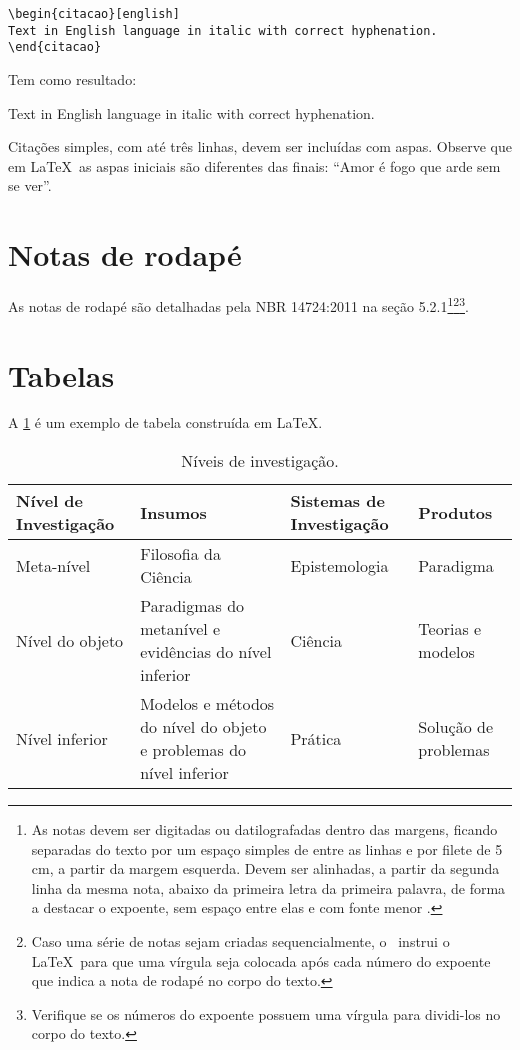 \begin{verbatim}
\begin{citacao}[english]
Text in English language in italic with correct hyphenation.
\end{citacao}
\end{verbatim}

Tem como resultado:

\begin{citacao}[english]
Text in English language in italic with correct hyphenation.
\end{citacao}

Citações simples, com até três linhas, devem ser incluídas com aspas. Observe que em \LaTeX\ as aspas iniciais são diferentes das finais: ``Amor é fogo que arde sem se ver''.

\section{Notas de rodapé}

As notas de rodapé são detalhadas pela NBR 14724:2011 na seção 5.2.1\footnote{As notas devem ser digitadas ou datilografadas dentro das margens, ficando separadas do texto por um espaço simples de entre as linhas e por filete de 5 cm, a partir da margem esquerda. Devem ser alinhadas, a partir da segunda linha da mesma nota, abaixo da primeira letra da primeira palavra, de forma a destacar o expoente, sem espaço entre elas e com fonte menor .}\footnote{Caso uma série de notas sejam criadas sequencialmente, o \abnTeX\ instrui o \LaTeX\ para que uma vírgula seja colocada após cada número do expoente que indica a nota de rodapé no corpo do texto.}\footnote{Verifique se os números do expoente possuem uma vírgula para dividi-los no corpo do texto.}.

\section{Tabelas}

A \cref{tab-nivinv} é um exemplo de tabela construída em
\LaTeX.

\begin{table}[htb]
\footnotesize
\caption[Níveis de investigação]{Níveis de investigação.}
\label{tab-nivinv}
\begin{tabular}{p{2.6cm}|p{6.0cm}|p{2.25cm}|p{3.40cm}}
   \textbf{Nível de Investigação} & \textbf{Insumos}  & \textbf{Sistemas de Investigação}  & \textbf{Produtos}  \\
    \hline
    Meta-nível & Filosofia da Ciência  & Epistemologia &
    Paradigma  \\
    \hline
    Nível do objeto & Paradigmas do metanível e evidências do nível inferior &
    Ciência  & Teorias e modelos \\
    \hline
    Nível inferior & Modelos e métodos do nível do objeto e problemas do nível inferior & Prática & Solução de problemas  \\
\end{tabular}
\end{table}


